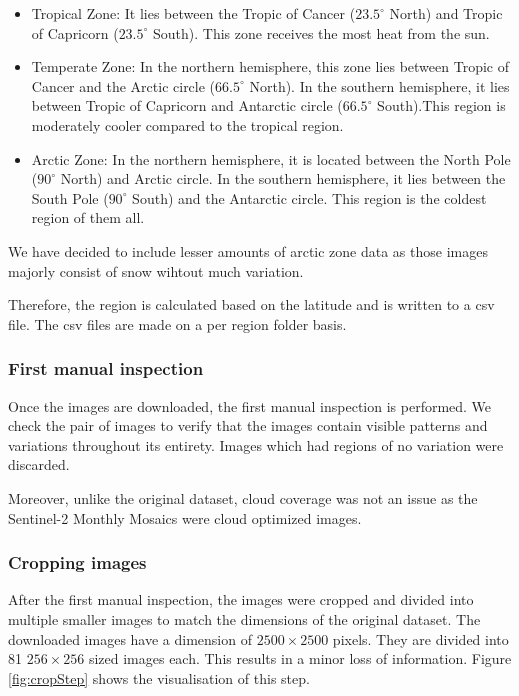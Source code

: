 \begin{itemize}
    \item Tropical Zone: It lies between the Tropic of Cancer ($23.5^\circ$ North) and Tropic of Capricorn ($23.5^\circ$ South). This zone receives the most heat from the sun.
    \item Temperate Zone: In the northern hemisphere, this zone lies between Tropic of Cancer and the Arctic circle ($66.5^\circ$ North). In the southern hemisphere, it lies between Tropic of Capricorn and Antarctic circle ($66.5^\circ$ South).This region is moderately cooler compared to the tropical region.
    \item Arctic Zone: In the northern hemisphere, it is located between the North Pole ($90^\circ$ North) and Arctic circle. In the southern hemisphere, it lies between the South Pole ($90^\circ$ South) and the Antarctic circle. This region is the coldest region of them all.
\end{itemize}

We have decided to include lesser amounts of arctic zone data as those images majorly consist of snow wihtout much variation.

Therefore, the region is calculated based on the latitude and is written to a csv file. The csv files are made on a per region folder basis.

\subsubsection{First manual inspection}
Once the images are downloaded, the first manual inspection is performed. We check the pair of images to verify that the images contain visible patterns and variations throughout its entirety. Images which had regions of no variation were discarded.

Moreover, unlike the original dataset, cloud coverage was not an issue as the Sentinel-2 Monthly Mosaics were cloud optimized images.

\subsubsection{Cropping images}
After the first manual inspection, the images were cropped and divided into multiple smaller images to match the dimensions of the original dataset. The downloaded images have a dimension of $2500\times2500$ pixels. They are divided into 81 $256\times256$ sized images each. This results in a minor loss of information. Figure \ref{fig:cropStep} shows the visualisation of this step.


